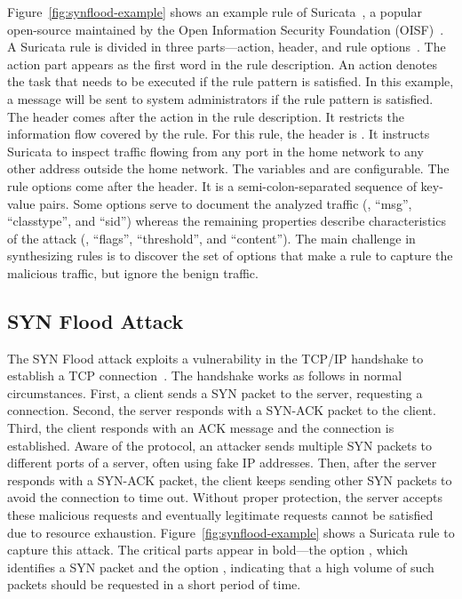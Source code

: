 \documentclass[runningheads]{llncs}
\begin{document}
Figure~\ref{fig:synflood-example} shows an example rule of
Suricata~\cite{suricata}, a popular open-source \nids{} maintained by
the Open Information Security Foundation (OISF)~\cite{oisf}. A
Suricata rule is divided in three parts---action, header, and rule
options~\cite{suri-rule-format}. The action part appears as the first
word in the rule description. An action denotes the task that needs to
be executed if the rule pattern is satisfied. In this example, a
message will be sent to system administrators if the rule pattern is
satisfied. The header comes after the action in the rule
description. It restricts the information flow covered by the
rule. For this rule, the header is . It instructs Suricata to inspect 
traffic flowing from any port in the home network to any other address
outside the home network. The variables  and
 are configurable. The rule options come after
the header. It is a semi-colon-separated sequence of key-value
pairs. Some options serve to document the analyzed traffic (\eg{},
``msg'', ``classtype'', and ``sid'') whereas the remaining properties
describe characteristics of the attack (\eg, ``flags'', ``threshold'',
and ``content''). The main challenge in synthesizing rules is to
discover the set of options that make a rule to capture the malicious
traffic, but ignore the benign traffic.

\subsection{SYN Flood Attack}

The SYN Flood attack exploits a vulnerability in the TCP/IP handshake
to establish a TCP connection~\cite{cloudfare-synflood}. The handshake
works as follows in normal circumstances. First, a client sends a SYN
packet to the server, requesting a connection. Second, the server
responds with a SYN-ACK packet to the client. Third, the client
responds with an ACK message and the connection is established. Aware
of the protocol, an attacker sends multiple SYN packets to different
ports of a server, often using fake IP addresses. Then, after the
server responds with a SYN-ACK packet, the client keeps sending other
SYN packets to avoid the connection to time out. Without proper
protection, the server accepts these malicious requests and eventually
legitimate requests cannot be satisfied due to resource exhaustion.
Figure~\ref{fig:synflood-example} shows a Suricata rule to capture
this attack. The critical parts appear in bold---the option
, which identifies a SYN packet and the option
,
indicating that a high volume of such packets should be requested in a
short period of time.
\end{document}
